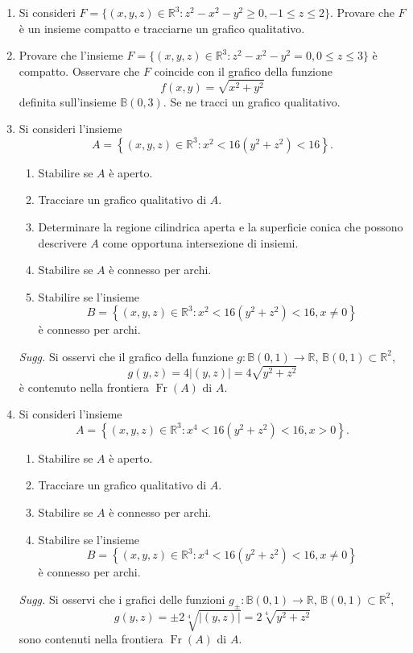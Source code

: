 \begin{enumerate}
	\item Si consideri $F = \{(x,y,z) \in \mathbb{R}^3 : z^2 - x^2 - y^2 \geq 0, -1 \leq z \leq 2\}$. Provare che $F$ è un insieme compatto e tracciarne un grafico qualitativo.
	
	\item Provare che l'insieme $F = \{(x,y,z) \in \mathbb{R}^3 : z^2 - x^2 - y^2 = 0, 0 \leq z \leq 3\}$ è compatto. Osservare che $F$ coincide con il grafico della funzione
	\[
	f (x, y) = \sqrt{x^2 + y^2}
	\]
	definita sull'insieme $\mathbb{B}(0,3)$. Se ne tracci un grafico qualitativo.
	
	\item Si consideri l'insieme
	\[
	A = \left\{(x, y, z) \in \mathbb{R}^3: x^2 < 16 (y^2 + z^2) < 16\right\}.
	\]
	\begin{enumerate}
		\item Stabilire se $A$ è aperto.
		\item Tracciare un grafico qualitativo di $A$.
		\item Determinare la regione cilindrica aperta e la superficie conica che possono descrivere $A$ come opportuna intersezione di insiemi.
		\item Stabilire se $A$ è connesso per archi.
		\item Stabilire se l'insieme
		\[
		B = \left\{(x, y, z) \in \mathbb{R}^3: x^2 < 16 (y^2 + z^2) < 16, x \neq 0\right\}
		\]
		è connesso per archi.
	\end{enumerate}
	\textit{Sugg.} Si osservi che il grafico della funzione $g: \mathbb{B}(0,1) \to \mathbb{R}$, $\mathbb{B}(0,1) \subset \mathbb{R}^2$,
	\[
	g (y, z) = 4 |(y, z)| = 4 \sqrt{y^2 + z^2}
	\]
	è contenuto nella frontiera $\operatorname{Fr}(A)$ di $A$.
	
	\item Si consideri l'insieme
	\[
	A = \left\{(x, y, z) \in \mathbb{R}^3: x^4 < 16 (y^2 + z^2) < 16, x > 0\right\}.
	\]
	\begin{enumerate}
		\item Stabilire se $A$ è aperto.
		\item Tracciare un grafico qualitativo di $A$.
		\item Stabilire se $A$ è connesso per archi.
		\item Stabilire se l'insieme
		\[
		B = \left\{(x, y, z) \in \mathbb{R}^3: x^4 < 16 (y^2 + z^2) < 16, x \neq 0\right\}
		\]
		è connesso per archi.
	\end{enumerate}
	\textit{Sugg.} Si osservi che i grafici delle funzioni $g_{\pm}:\mathbb{B}(0,1)\to \mathbb{R}$, $\mathbb{B}(0,1)\subset \mathbb{R}^2$,
	\[
	g (y, z) = \pm 2 \sqrt[4]{|(y, z)|} = 2 \sqrt[4]{y^2 + z^2}
	\]
	sono contenuti nella frontiera $\operatorname{Fr}(A)$ di $A$.
	

\end{enumerate}
